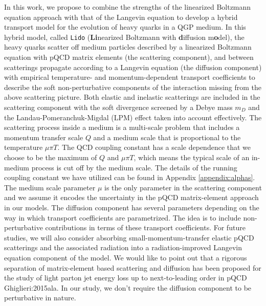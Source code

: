 In this work, we propose to combine the strengths of the linearized Boltzmann equation approach with that of the Langevin equation to develop a hybrid transport model for the evolution of heavy quarks in a QGP medium.
In this hybrid model, called {\tt Lido} ({\bf Li}nearized Boltzmann with {\bf d}iffusion m{\bf o}del),  the heavy quarks scatter off medium particles described by a linearized Boltzmann equation with pQCD matrix elements (the scattering component), and between scatterings propagate according to a Langevin equation (the diffusion component) with empirical temperature- and momentum-dependent transport coefficients to describe the soft non-perturbative components of the interaction missing from the above scattering picture.
Both elastic and inelastic scatterings are included in the scattering component with the soft divergence screened by a Debye mass $m_D$ and the Landau-Pomeranchuk-Migdal (LPM) effect taken into account effectively.
The scattering process inside a medium is a multi-scale problem that includes a momentum transfer scale $Q$ and a medium scale that is proportional to the temperature $\mu\pi T$.
The QCD coupling constant has a scale dependence that we choose to be the maximum of $Q$ and $\mu\pi T$, which means the typical scale of an in-medium process is cut off by the medium scale.
The details of the running coupling constant we have utilized can be found in Appendix \ref{appendix:alphas}.
The medium scale parameter $\mu$ is the only parameter in the scattering component and we assume it encodes the uncertainty in the pQCD matrix-element approach in our models.
The diffusion component has several parameters depending on the way in which transport coefficients are parametrized. 
The idea is to include non-perturbative contributions in terms of these transport coefficients.
For future studies, we will also consider absorbing small-momentum-transfer elastic pQCD scatterings and the associated radiation into a radiation-improved Langevin equation component of the model.
We would like to point out that a rigorous separation of matrix-element based scattering and diffusion has been proposed for the study of light parton jet energy loss up to next-to-leading order in pQCD {Ghiglieri:2015ala}.
In our study, we don't require the diffusion component to be perturbative in nature.

